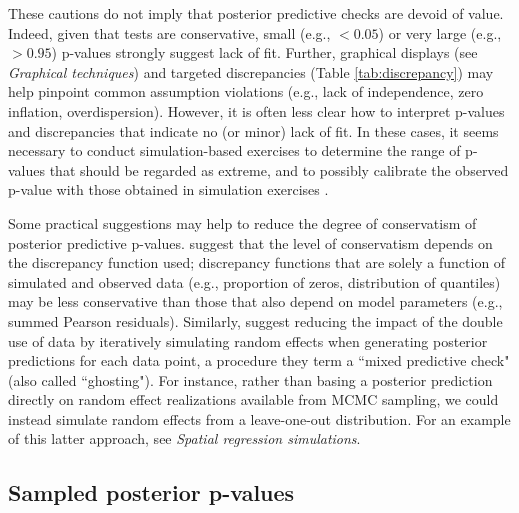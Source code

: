 \documentclass[12pt,english]{article}
\begin{document}
\begin{spacing}{1.9}
These cautions do not imply that posterior predictive checks are
devoid of value.  Indeed, given that tests are conservative, small
(e.g., $<0.05$) or very large (e.g., $>0.95$) p-values strongly
suggest lack of fit.  Further, graphical displays (see
\textit{Graphical techniques}) and targeted discrepancies (Table
\ref{tab:discrepancy}) may help pinpoint common assumption violations
(e.g., lack of independence, zero inflation, overdispersion).
However, it is often less clear how to interpret p-values and
discrepancies that indicate no (or minor) lack of fit. In these cases,
it seems necessary to conduct simulation-based exercises to determine
the range of p-values that should be regarded as extreme, and to
possibly calibrate the observed p-value with those obtained in
simulation exercises \citep[e.g.,][]{DeyEtAl1998,HjortEtAl2006}.

Some practical suggestions may help to reduce the degree of
conservatism of posterior predictive p-values.  \citet{LunnEtAl2013}
suggest that the level of conservatism depends on the discrepancy
function used; discrepancy functions that are solely a function of
simulated and observed data (e.g., proportion of zeros, distribution
of quantiles) may be less conservative than those that also depend on
model parameters (e.g., summed Pearson residuals).  Similarly,
\citet{MarshallSpiegelhalter2003} suggest reducing the impact of the
double use of data by iteratively simulating random effects when
generating posterior predictions for each data point, a procedure they
term a ``mixed predictive check" (also called ``ghosting"). For instance,
rather than basing a posterior prediction directly on random effect realizations
available from MCMC sampling, we could instead simulate random effects
from a leave-one-out distribution.  For an
example of this latter approach, see \textit{Spatial regression
  simulations}.

\subsection{Sampled posterior p-values}


\end{spacing}
\end{document}
